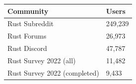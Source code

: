 \begin{table}[]
\begin{tabular}{|l|l|}
\hline
\textbf{Community}           & \textbf{Users} \\ \hline
Rust Subreddit               & 249,239        \\ \hline
Rust Forums                  & 26,973         \\ \hline
Rust Discord                 & 47,787         \\ \hline
Rust Survey 2022 (all)       & 11,482         \\ \hline
Rust Survey 2022 (completed) & 9,433          \\ \hline
\end{tabular}
\end{table}